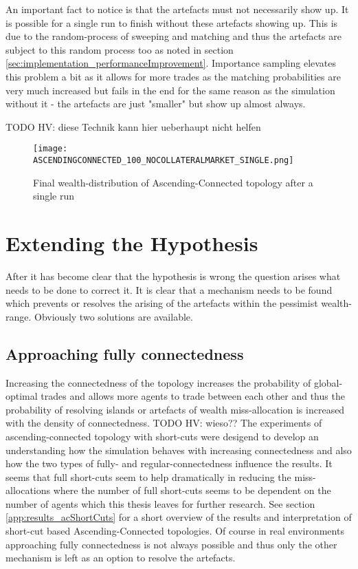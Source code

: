 \documentclass[Bachelorarbeit.tex]{subfiles}
\begin{document}
\medskip 

An important fact to notice is that the artefacts must not necessarily show up. It is possible for a single run to finish without these artefacts showing up. This is due to the random-process of sweeping and matching and thus the artefacts are subject to this random process too as noted in section \ref{sec:implementation_performanceImprovement}. Importance sampling elevates this problem a bit as it allows for more trades as the matching probabilities are very much increased but fails in the end for the same reason as the simulation without it - the artefacts are just "smaller" but show up almost always.

TODO HV: diese Technik kann hier ueberhaupt nicht helfen

\begin{figure}[H]
	\centering
  \texttt{[image: ASCENDINGCONNECTED\_100\_NOCOLLATERALMARKET\_SINGLE.png]}
	\caption{Final wealth-distribution of Ascending-Connected topology after a single run}
	\label{fig:wealth_ASCENDINGCONNECTED_IS_100_NOCOLLATERALMARKET_SINGLE}
\end{figure}

\section{Extending the Hypothesis}
After it has become clear that the hypothesis is wrong the question arises what needs to be done to correct it. It is clear that a mechanism needs to be found which prevents or resolves the arising of the artefacts within the pessimist wealth-range. Obviously two solutions are available.

\subsection{Approaching fully connectedness}
Increasing the connectedness of the topology increases the probability of global-optimal trades and allows more agents to trade between each other and thus the probability of resolving islands or artefacts of wealth miss-allocation is increased with the density of connectedness. TODO HV: wieso??
The experiments of ascending-connected topology with short-cuts were desigend to develop an understanding how the simulation behaves with increasing connectedness and also how the two types of  fully- and regular-connectedness influence the results.
It seems that full short-cuts seem to help dramatically in reducing the miss-allocations where the number of full short-cuts seems to be dependent on the number of agents which this thesis leaves for further research. See section \ref{app:results_acShortCuts} for a short overview of the results and interpretation of short-cut based Ascending-Connected topologies.
\linebreak
Of course in real environments approaching fully connectedness is not always possible and thus only the other mechanism is left as an option to resolve the artefacts.
\end{document}

